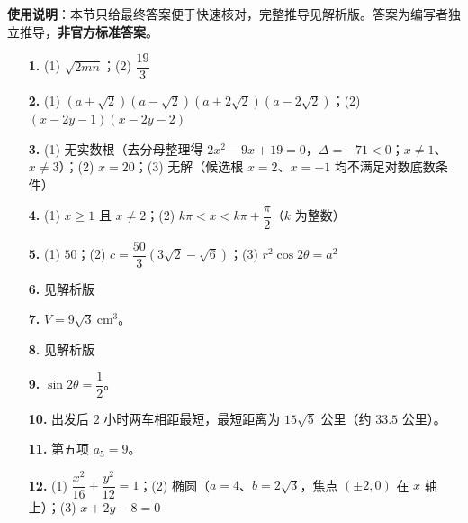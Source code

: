 
\begin{gknotice}
\textbf{使用说明}：本节只给最终答案便于快速核对，完整推导见解析版。答案为编写者独立推导，\textbf{非官方标准答案}。
\end{gknotice}

\begin{itemize}[leftmargin=2.6em]
  \item[\textbf{1.}] (1) $\sqrt{2mn}$；(2) $\dfrac{19}{3}$
  \item[\textbf{2.}] (1) $(a+\sqrt2)(a-\sqrt2)(a+2\sqrt2)(a-2\sqrt2)$；(2) $(x-2y-1)(x-2y-2)$
  \item[\textbf{3.}] (1) 无实数根（去分母整理得 $2x^2-9x+19=0$，$\Delta=-71<0$；$x\ne1$、$x\ne3$）；(2) $x=20$；(3) 无解（候选根 $x=2$、$x=-1$ 均不满足对数底数条件）
  \item[\textbf{4.}] (1) $x\ge1$ 且 $x\ne2$；(2) $k\pi<x<k\pi+\dfrac{\pi}{2}$（$k$ 为整数）
  \item[\textbf{5.}] (1) $50$；(2) $c=\dfrac{50}{3}\left(3\sqrt2-\sqrt6\right)$；(3) $r^2\cos2\theta=a^2$
  \item[\textbf{6.}] 见解析版
  \item[\textbf{7.}] $V=9\sqrt3\ \mathrm{cm^3}$。
  \item[\textbf{8.}] 见解析版
  \item[\textbf{9.}] $\sin2\theta=\dfrac12$。
  \item[\textbf{10.}] 出发后 $2$ 小时两车相距最短，最短距离为 $15\sqrt5$ 公里（约 $33.5$ 公里）。
  \item[\textbf{11.}] 第五项 $a_5=9$。
  \item[\textbf{12.}] (1) $\dfrac{x^2}{16}+\dfrac{y^2}{12}=1$；(2) 椭圆（$a=4$、$b=2\sqrt3$，焦点 $(\pm2,0)$ 在 $x$ 轴上）；(3) $x+2y-8=0$
\end{itemize}

